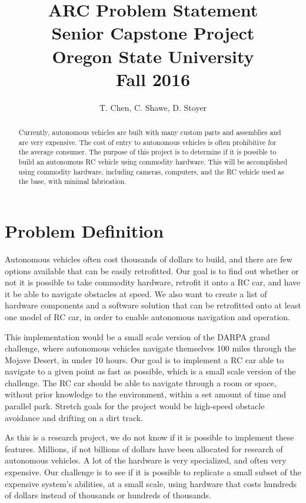 \documentclass[draftclsnofoot,onecolumn,10pt]{IEEEtran}
\begin{document}
\begin{titlepage}
\title{
ARC Problem Statement\\
\LARGE
Senior Capstone Project\\
Oregon State University\\
Fall 2016
}

\author{T. Chen, C. Shawe, D. Stoyer}
\maketitle

\begin{abstract}
Currently, autonomous vehicles are built with many custom parts and assemblies
and are very expensive. The cost of entry to autonomous vehicles is often
prohibitive for the average consumer. The purpose of this project is to determine
if it is possible to build an autonomous RC vehicle using commodity hardware.
This will be accomplished using commodity hardware, including cameras, computers,
and the RC vehicle used as the base, with minimal fabrication.
\end{abstract}

\thispagestyle{empty} %

\end{titlepage}


\newpage

\section{Problem Definition}
Autonomous vehicles often cost thousands of dollars to build, and there are few
options available that can be easily retrofitted. Our goal is to find out whether
or not it is possible to take commodity hardware, retrofit it onto a RC car, and
have it be able to navigate obstacles at speed. We also want to create a list of
hardware components and a software solution that can be retrofitted onto at least
one model of RC car, in order to enable autonomous navigation and operation.\par
This implementation would be a small scale version of the DARPA grand challenge,
where autonomous vehicles navigate themselves 100 miles through the Mojave Desert,
in under 10 hours. Our goal is to implement a RC car able to navigate to a given
point as fast as possible, which is a small scale version of the challenge. The RC
car should be able to navigate through a room or space, without prior knowledge to
the environment, within a set amount of time and parallel park. Stretch goals for
the project would be high-speed obstacle avoidance and drifting on a dirt track.\par
As this is a research project, we do not know if it is possible to implement 
these features. Millions, if not billions of dollars have been allocated for
research of autonomous vehicles. A lot of the hardware is very specialized, and
often very expensive. Our challenge is to see if it is possible to replicate a small
subset of the expensive system's abilities, at a small scale, using hardware that costs 
hundreds of dollars instead of thousands or hundreds of thousands. 
\end{document}
